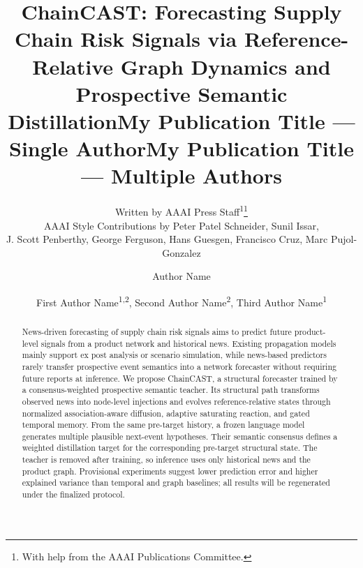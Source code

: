 \documentclass[letterpaper]{article} %
\title{ChainCAST: Forecasting Supply Chain Risk Signals via Reference-Relative Graph Dynamics and Prospective Semantic Distillation}
\author{
    Written by AAAI Press Staff\textsuperscript{\rm 1}\thanks{With help from the AAAI Publications Committee.}\\
    AAAI Style Contributions by Peter Patel Schneider,
    Sunil Issar,\\
    J. Scott Penberthy,
    George Ferguson,
    Hans Guesgen,
    Francisco Cruz\equalcontrib\corresponding,
    Marc Pujol-Gonzalez\equalcontrib\corresponding
}
\title{My Publication Title --- Single Author}
\author {
    Author Name
}
\title{My Publication Title --- Multiple Authors}
\author {
    First Author Name\textsuperscript{\rm 1,\rm 2}\equalcontrib,
    Second Author Name\textsuperscript{\rm 2}\equalcontrib,
    Third Author Name\textsuperscript{\rm 1}\corresponding
}
\begin{document}
\maketitle

\begin{abstract}
News-driven forecasting of supply chain risk signals aims to predict future product-level signals from a product network and historical news. Existing propagation models mainly support ex post analysis or scenario simulation, while news-based predictors rarely transfer prospective event semantics into a network forecaster without requiring future reports at inference. We propose ChainCAST, a structural forecaster trained by a consensus-weighted prospective semantic teacher. Its structural path transforms observed news into node-level injections and evolves reference-relative states through normalized association-aware diffusion, adaptive saturating reaction, and gated temporal memory. From the same pre-target history, a frozen language model generates multiple plausible next-event hypotheses. Their semantic consensus defines a weighted distillation target for the corresponding pre-target structural state. The teacher is removed after training, so inference uses only historical news and the product graph. Provisional experiments suggest lower prediction error and higher explained variance than temporal and graph baselines; all results will be regenerated under the finalized protocol.
\end{abstract}

\end{document}
